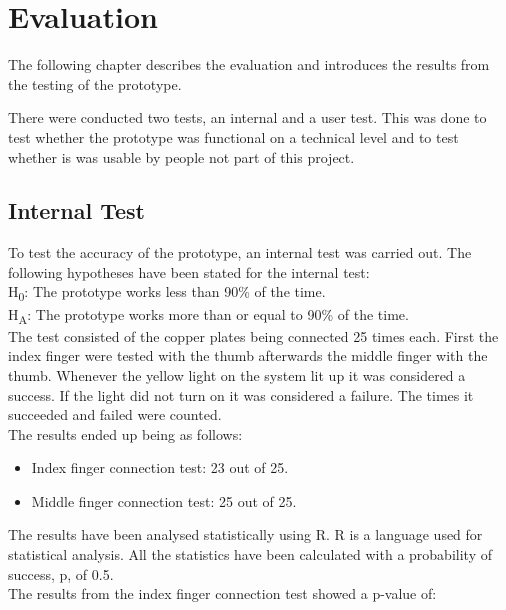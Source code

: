 \chapter{Evaluation}

The following chapter describes the evaluation and introduces the results from the testing of the prototype. 

There were conducted two tests, an internal and a user test. This was done to test whether the prototype was functional on a technical level and to test whether is was usable by people not part of this project. 


\section{Internal Test}

To test the accuracy of the prototype, an internal test was carried out. The following hypotheses have been stated for the internal test: \\

H\textsubscript{0}: The prototype works less than 90\% of the time.\\

H\textsubscript{A}: The prototype works more than or equal to 90\% of the time.\\

The test consisted of the copper plates being connected 25 times each. First the index finger were tested with the thumb afterwards the middle finger with the thumb. Whenever the yellow light on the system lit up it was considered a success. If the light did not turn on it was considered a failure. The times it succeeded and failed were counted.\\

The results ended up being as follows:

\begin{itemize}
\item Index finger connection test: 23 out of 25. 
\item Middle finger connection test: 25 out of 25.\\
\end{itemize}


The results have been analysed statistically using R\citep{R}. R is a language used for statistical analysis. All the statistics have been calculated with a probability of success, p, of 0.5.\\
The results from the index finger connection test showed a p-value of:

